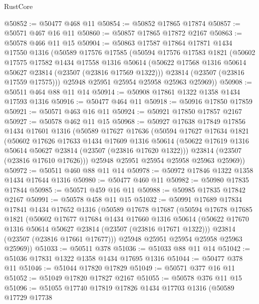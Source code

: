 \begin{lexlean}{RustCore}
\begin{coremodule}
@50852 := @50477 @468 @11
@50854 := @50852 @17865 @17874
@50857 := @50571 @467 @16 @11
@50860 := @50857 @17865 @17872 @2167
@50863 := @50578 @466 @11 @15
@50904 := @50863
    @17587
    @17864
    @17871
    @1434
    @17550
    @1316
    (@50589
      @17576
      @17585
      (@50594
        @17576
        @17583
        @1821
        (@50602
          @17575
          @17582
          @1434
          @17558
          @1316
          @50614
          (@50622 @17568 @1316 @50614 @50627 @23814 (@23507 (@23816 @17569 @1322)))
          @23814
          (@23507 (@23816 @17559 @17575)))
        @25948
        @25951
        @25954
        @25958
        @25963
        @25969))
@50908 := @50511 @464 @88 @11 @14
@50914 := @50908 @17861 @1322 @1358 @1434 @17593 @1316
@50916 := @50477 @464 @11
@50918 := @50916 @17850 @17859
@50921 := @50571 @463 @16 @11
@50924 := @50921 @17850 @17857 @2167
@50927 := @50578 @462 @11 @15
@50968 := @50927
    @17638
    @17849
    @17856
    @1434
    @17601
    @1316
    (@50589
      @17627
      @17636
      (@50594
        @17627
        @17634
        @1821
        (@50602
          @17626
          @17633
          @1434
          @17609
          @1316
          @50614
          (@50622 @17619 @1316 @50614 @50627 @23814 (@23507 (@23816 @17620 @1322)))
          @23814
          (@23507 (@23816 @17610 @17626)))
        @25948
        @25951
        @25954
        @25958
        @25963
        @25969))
@50972 := @50511 @460 @88 @11 @14
@50978 := @50972 @17846 @1322 @1358 @1434 @17644 @1316
@50980 := @50477 @460 @11
@50982 := @50980 @17835 @17844
@50985 := @50571 @459 @16 @11
@50988 := @50985 @17835 @17842 @2167
@50991 := @50578 @458 @11 @15
@51032 := @50991
    @17689
    @17834
    @17841
    @1434
    @17652
    @1316
    (@50589
      @17678
      @17687
      (@50594
        @17678
        @17685
        @1821
        (@50602
          @17677
          @17684
          @1434
          @17660
          @1316
          @50614
          (@50622 @17670 @1316 @50614 @50627 @23814 (@23507 (@23816 @17671 @1322)))
          @23814
          (@23507 (@23816 @17661 @17677)))
        @25948
        @25951
        @25954
        @25958
        @25963
        @25969))
@51033 := @50511 @378
@51036 := @51033 @88 @11 @14
@51042 := @51036 @17831 @1322 @1358 @1434 @17695 @1316
@51044 := @50477 @378 @11
@51046 := @51044 @17820 @17829
@51049 := @50571 @377 @16 @11
@51052 := @51049 @17820 @17827 @2167
@51055 := @50578 @376 @11 @15
@51096 := @51055
    @17740
    @17819
    @17826
    @1434
    @17703
    @1316
    (@50589
      @17729
      @17738

\end{coremodule}
\end{lexlean}
